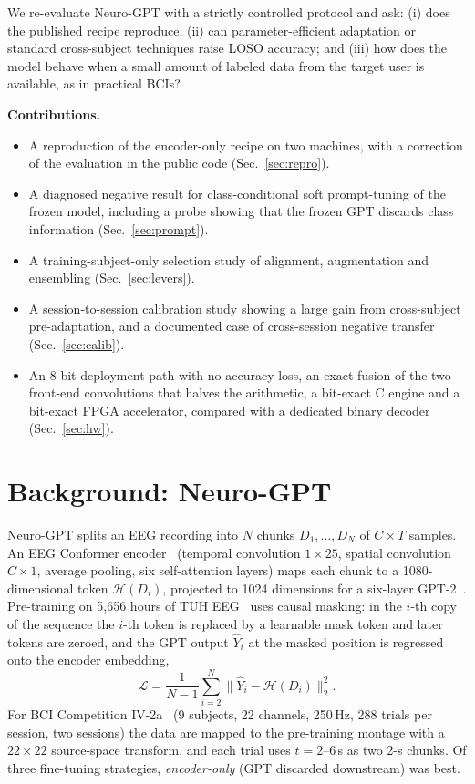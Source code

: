 \documentclass[conference]{IEEEtran}
\begin{document}
We re-evaluate Neuro-GPT with a strictly controlled protocol and ask: (i) does the published recipe reproduce;
(ii) can parameter-efficient adaptation or standard cross-subject techniques raise LOSO accuracy; and (iii) how does
the model behave when a small amount of labeled data from the target user is available, as in practical BCIs?

\textbf{Contributions.}
\begin{itemize}
\item A reproduction of the encoder-only recipe on two machines, with a correction of the evaluation in the public code
(Sec.~\ref{sec:repro}).
\item A diagnosed negative result for class-conditional soft prompt-tuning of the frozen model, including a probe
showing that the frozen GPT discards class information (Sec.~\ref{sec:prompt}).
\item A training-subject-only selection study of alignment, augmentation and ensembling (Sec.~\ref{sec:levers}).
\item A session-to-session calibration study showing a large gain from cross-subject pre-adaptation, and a
documented case of cross-session negative transfer (Sec.~\ref{sec:calib}).
\item An 8-bit deployment path with no accuracy loss, an exact fusion of the two front-end convolutions that halves
the arithmetic, a bit-exact C engine and a bit-exact FPGA accelerator, compared with a dedicated binary decoder
(Sec.~\ref{sec:hw}).
\end{itemize}

\section{Background: Neuro-GPT}
Neuro-GPT splits an EEG recording into $N$ chunks $D_1,\dots,D_N$ of $C\times T$ samples. An EEG Conformer
encoder~\cite{song2023conformer} (temporal convolution $1\times25$, spatial convolution $C\times1$, average pooling,
six self-attention layers) maps each chunk to a 1080-dimensional token $\mathcal{H}(D_i)$, projected to 1024 dimensions
for a six-layer GPT-2~\cite{radford2019gpt2}. Pre-training on 5,656 hours of TUH EEG~\cite{obeid2016tuh} uses causal
masking: in the $i$-th copy of the sequence the $i$-th token is replaced by a learnable mask token and later tokens are
zeroed, and the GPT output $\hat{Y}_i$ at the masked position is regressed onto the encoder embedding,
\begin{equation}
\mathcal{L} = \frac{1}{N-1}\sum_{i=2}^{N}\big\lVert \hat{Y}_i - \mathcal{H}(D_i)\big\rVert_2^2 .
\end{equation}
For BCI Competition IV-2a~\cite{brunner2008bci2a} (9 subjects, 22 channels, 250\,Hz, 288 trials per session, two
sessions) the data are mapped to the pre-training montage with a $22\times22$ source-space transform, and each trial
uses $t=2$--$6$\,s as two 2-s chunks. Of three fine-tuning strategies, \emph{encoder-only} (GPT discarded downstream)
was best.
\end{document}
